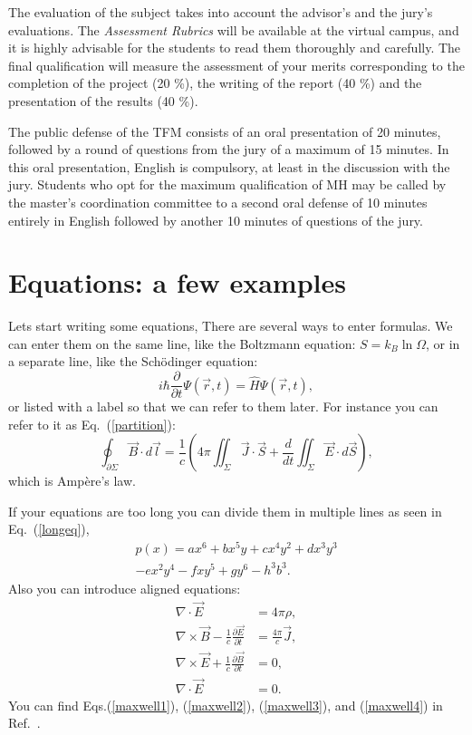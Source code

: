 \documentclass[aps,pra,twocolumn,10pt,floatfix]{revtex4-2}
\begin{document}
The evaluation of the subject takes into account the advisor's and the jury's evaluations. 
The {\it Assessment Rubrics} will be available at the virtual campus, and it is highly advisable for the students to read them thoroughly and carefully. 
The final qualification will measure the assessment of your merits corresponding to the completion of the project (20 \%), the writing of the report (40 \%) and the presentation of the results (40 \%).

The public defense of the TFM consists of an oral presentation of 20 minutes, followed by a round of questions from the jury of a maximum of 15 minutes. In this oral presentation, English is compulsory, at least in the discussion with the jury. Students who opt for the maximum qualification of MH may be called by the master's coordination committee to a second oral defense of 10 minutes entirely in English followed by another 10 minutes of questions of the jury. 


\section{Equations: a few examples}

Lets start writing some equations, There are several ways to enter formulas. We can enter them on the same line, like the Boltzmann equation: $S=k_B\ln\Omega$, or in a separate line, like the Sch\"{o}dinger equation: $$i\hbar\frac{\partial}{\partial t}\Psi(\vec{r},t) = \hat{H}\Psi(\vec{r},t),$$ or listed with a label so that we can refer to them later. For instance you can refer to it as Eq.~(\ref{partition}):
\begin{equation}
\oint_{\partial \Sigma}\vec{B}\cdot d\vec{l} = \frac{1}{c}\left(4\pi\iint_{\Sigma}\vec{J}\cdot\vec{S}+\frac{d}{dt}\iint_{\Sigma}\vec{E}\cdot d\vec{S}\right),
\label{partition}
\end{equation}
which is Amp\`{e}re's law.

If your equations are too long you can divide them in multiple lines as seen in Eq.~(\ref{longeq}),
\begin{multline}
p(x) = ax^6 + bx^5y + cx^4y^2 + dx^3y^3\\ 
- ex^2y^4 - fxy^5 + gy^6 - h^3b^3.
\label{longeq}
\end{multline}
Also you can introduce aligned equations:
\begin{align} 
\nabla {\cdot} \vec{E}&= 4 \pi \rho, \label{maxwell1}\\
\nabla \times \vec{B} - \frac{1}{c} \frac{\partial \vec{E}}{\partial t} &=
\frac{4 \pi}{c} \vec{J}, \label{maxwell2}\\
\nabla \times \vec{E} +\frac{1}{c} \frac{\partial \vec{B}}{\partial t} &=
0, \label{maxwell3}\\
\nabla {\cdot} \vec{E}&= 0.
\label{maxwell4}
\end{align}
You can find Eqs.(\ref{maxwell1}), (\ref{maxwell2}), (\ref{maxwell3}), and (\ref{maxwell4}) in Ref.~\cite{jackson}.
\end{document}
